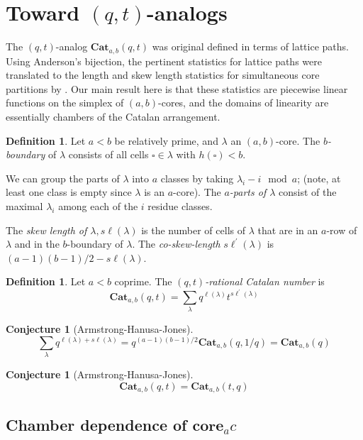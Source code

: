 \documentclass{amsart}[12pt]
\theoremstyle{definition}
\newtheorem{definition}[dummy]{Definition}
\newtheorem{conjecture}[dummy]{Conjecture}
\newcommand{\core}{\mathbf{core}}
\newcommand{\Cat}{\mathbf{Cat}}
\newcommand{\sk}{s\ell}
\begin{document}
\section{Toward \texorpdfstring{$(q,t)$}{(q,t)}-analogs}

The $(q,t)$-analog $\Cat_{a,b}(q,t)$ was original defined in terms of lattice paths.  Using Anderson's bijection, the pertinent statistics for lattice paths were translated to the length and skew length statistics for simultaneous core partitions by \cite{AHJ}.  Our main result here is that these statistics are piecewise linear functions on the simplex of $(a,b)$-cores, and the domains of linearity are essentially chambers of the Catalan arrangement. 




\begin{definition}
Let $a<b$ be relatively prime, and $\lambda$ an $(a,b)$-core.  The                  \emph{$b$-boundary} of $\lambda$ consists of all cells $\square\in\lambda$ with $h(\square)<b$.

We can group the parts of $\lambda$ into $a$ classes by taking $\lambda_i-i\mod a$; (note, at least one class is empty since $\lambda$ is an $a$-core).  The \emph{$a$-parts of $\lambda$} consist of the maximal $\lambda_i$ among each of the $i$ residue classes.

The \emph{skew length of $\lambda, \sk(\lambda)$} is the number of cells of $\lambda$ that are in an $a$-row of $\lambda$ and in the $b$-boundary of $\lambda$. The \emph{co-skew-length} $\sk^\prime(\lambda)$ is $(a-1)(b-1)/2-\sk(\lambda)$.

\end{definition}


\begin{definition}
Let $a<b$ coprime.  The \emph{$(q,t)$-rational Catalan number} is
$$\Cat_{a,b}(q,t)=\sum_\lambda q^{\ell(\lambda)}t^{\sk^\prime(\lambda)}$$
\end{definition}

\begin{conjecture}[Armstrong-Hanusa-Jones]
$$\sum_{\lambda} q^{\ell(\lambda)+\sk(\lambda)}=q^{(a-1)(b-1)/2}\Cat_{a,b}(q,1/q)=\Cat_{a,b}(q)$$
\end{conjecture}

\begin{conjecture}[Armstrong-Hanusa-Jones]
$$\Cat_{a,b}(q,t)=\Cat_{a,b}(t,q)$$
\end{conjecture}



\subsection{Chamber dependence of \texorpdfstring{$\core_a{c}$}{core(c)}}
\end{document}
